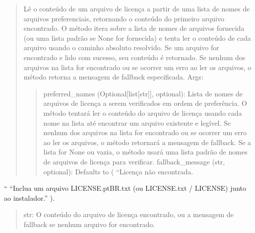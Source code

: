 \documentclass[letterpaper,10pt,english]{sphinxmanual}
\begin{document}
\begin{fulllineitems}
\label{\detokenize{api/license_dialog:license_dialog.read_license_text}}
\pysigstartsignatures
\pysiglinewithargsret
{}
{\sphinxparamcomma {}}
{}
\pysigstopsignatures\begin{quote}\begin{description}
\sphinxAtStartPar

\sphinxAtStartPar
{}

\sphinxAtStartPar
Lê o conteúdo de um arquivo de licença a partir de uma lista de nomes de arquivos preferenciais, retornando o conteúdo do primeiro arquivo encontrado. O método itera sobre a lista de nomes de arquivos fornecida (ou uma lista padrão se None for fornecida) e tenta ler o conteúdo de cada arquivo usando o caminho absoluto resolvido. Se um arquivo for encontrado e lido com sucesso, seu conteúdo é retornado. Se nenhum dos arquivos na lista for encontrado ou se ocorrer um erro ao ler os arquivos, o método retorna a mensagem de fallback especificada.
Args:
\begin{quote}

\sphinxAtStartPar
preferred\_names (Optional{[}list{[}str{]}{]}, optional): Lista de nomes de arquivos de licença a serem verificados em ordem de preferência. O método tentará ler o conteúdo do arquivo de licença usando cada nome na lista até encontrar um arquivo existente e legível. Se nenhum dos arquivos na lista for encontrado ou se ocorrer um erro ao ler os arquivos, o método retornará a mensagem de fallback. Se a lista for None ou vazia, o método usará uma lista padrão de nomes de arquivos de licença para verificar.
fallback\_message (str, optional):  Defaults to ( “Licença não encontrada.
\end{quote}


\end{description}\end{quote}

\sphinxAtStartPar
“ “Inclua um arquivo LICENSE.pt\sphinxhyphen{}BR.txt (ou LICENSE.txt / LICENSE) junto ao instalador.” ).
\begin{quote}
\begin{description}
\sphinxAtStartPar
str: O conteúdo do arquivo de licença encontrado, ou a mensagem de fallback se nenhum arquivo for encontrado.

\end{description}
\end{quote}

\end{fulllineitems}
\end{document}
